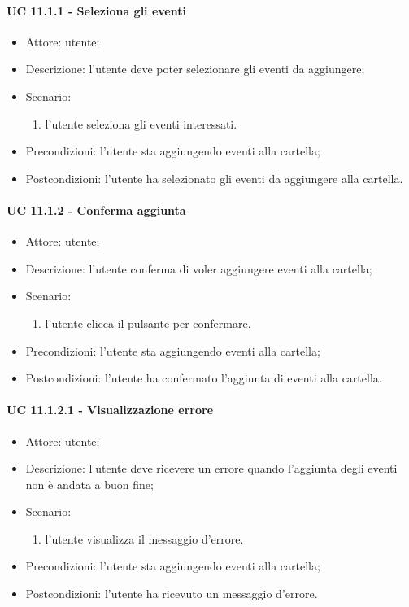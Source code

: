     \paragraph{UC 11.1.1 - Seleziona gli eventi}
    \begin{itemize}
        \item Attore: utente;
        \item Descrizione: l'utente deve poter selezionare gli eventi da aggiungere;
        \item Scenario:
        \begin{enumerate}
        \item l'utente seleziona gli eventi interessati.
        \end{enumerate}
        \item Precondizioni: l'utente sta aggiungendo eventi alla cartella;
        \item Postcondizioni: l'utente ha selezionato gli eventi da aggiungere alla cartella.
    \end{itemize}
    \paragraph{UC 11.1.2 - Conferma aggiunta}
    \begin{itemize}
        \item Attore: utente;
        \item Descrizione: l'utente conferma di voler aggiungere eventi alla cartella;
        \item Scenario:
        \begin{enumerate}
        \item l'utente clicca il pulsante per confermare.
        \end{enumerate}
        \item Precondizioni: l'utente sta aggiungendo eventi alla cartella;
        \item Postcondizioni: l'utente ha confermato l'aggiunta di eventi alla cartella.
    \end{itemize}
    \paragraph{UC 11.1.2.1 - Visualizzazione errore}
    \begin{itemize}
        \item Attore: utente;
        \item Descrizione: l'utente deve ricevere un errore quando l'aggiunta degli eventi non è andata a buon fine;
        \item Scenario:
        \begin{enumerate}
        \item l'utente visualizza il messaggio d'errore.
        \end{enumerate}   
        \item Precondizioni: l'utente sta aggiungendo eventi alla cartella;
        \item Postcondizioni: l'utente ha ricevuto un messaggio d'errore.
    \end{itemize}

